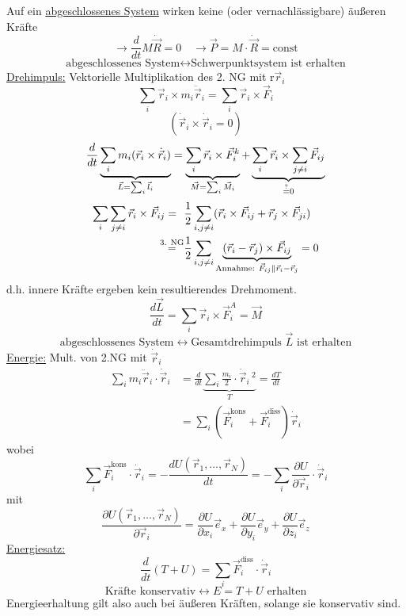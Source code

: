 \documentclass[titlepage,12pt,a4paper,ngerman]{report}
\newcommand{\tx}[1]{\textrm{#1}}
\begin{document}
{Auf ein \underline{abgeschlossenes System} wirken keine (oder vernachlässigbare) äußeren Kräfte\\
$$\rightarrow \frac{d}{dt} M \dot{\vec{R}} = 0 \quad \rightarrow \vec{P} = M \cdot \dot{\vec{R}} = \textrm{const}$$
$$\textrm{abgeschlossenes System} \leftrightarrow \textrm{Schwerpunktsystem ist erhalten}$$
\underline{Drehimpuls:} 
Vektorielle Multiplikation des 2. NG mit r$\vec{r}_i$ 
$$ \sum_{i} \vec{r}_i \times m_i\ddot{\vec{r}}_i = \sum_{i} \vec{r}_i \times \vec{F}_i$$
$$( \dot{\vec{r}}_i \times \dot{\vec{r}}_i = 0)$$
$$\frac{d}{dt} \underbrace{\sum_i m_i (\vec{r}_i \times \dot{\vec{r}}_i)} _{\vec{L} = \sum_i \vec{l}_i} = \underbrace{\sum_i \vec{r}_i \times \vec{F}_i^k}_{\vec{M} = \sum_i \vec{M}_i} + \underbrace{\sum_i \vec{r}_i \times \sum _{j\neq i} \vec{F}_{ij}}_{\buildrel ? \over = 0}$$
\begin{align*}
\sum_i \sum_{j\neq i} \vec{r}_i \times \vec{F}_{ij} = \ \  &\frac{1}{2} \sum_{i, j\neq i} (\vec{r}_i \times \vec{F}_{ij} + \vec{r}_j\times \vec{F}_{ji}) \\
\buildrel \textrm{3. NG} \over = &\frac{1}{2} \sum_{i,j\neq i} \underbrace{(\vec{r}_i - \vec{r}_j) \times \vec{F}_{ij}}_{\textrm{Annahme: } \vec{F}_{ij} \parallel \vec{r}_i - \vec{r}_j} = 0
\end{align*}
d.h. innere Kräfte ergeben kein resultierendes Drehmoment.
$$\frac{d\vec{L}}{dt} = \sum_i \vec{r}_i \times \vec{F}_i^A = \vec{M}  $$
$$\textrm{abgeschlossenes System} \leftrightarrow \textrm{Gesamtdrehimpuls } \vec{L} \textrm{ ist erhalten}$$
\underline{Energie:}
Mult. von 2.NG mit $\dot{\vec{r}}_i$ 
\begin{align*}
\sum_i m_i \ddot{\vec{r}}_i \cdot \dot{\vec{r}}_i &= \frac{d}{dt} \underbrace{\sum_i \frac{m_i}{2} \cdot \dot{\vec{r}}_i\,^2}_{T} = \frac{dT}{dt} \\
&= \sum_i (\vec{F}_{i}^{\tx{kons}} + \vec{F}_{i}^{\tx{diss}}) \dot{\vec{r}}_i
\end{align*}
wobei
$$ \sum_i \vec{F}_i^{\tx{kons}} \cdot \dot{\vec{r}}_i = -\frac{dU(\vec{r}_1,\dots , \vec{r}_N)}{dt} = - \sum_i \frac{\partial U}{\partial \vec{r}_i} \cdot \dot{\vec{r}}_i$$
mit
$$\frac{\partial U (\vec{r}_1, \dots , \vec{r}_N)}{\partial \vec{r}_i} = \frac{\partial U}{\partial x_i} \vec{e}_x + \frac{\partial U}{\partial y_i } \vec{e}_y + \frac{\partial U}{\partial z_i } \vec{e}_z$$
\underline{Energiesatz:}
$$ \frac{d}{dt} (T+U) = \sum_i \vec{F}^{\tx{diss}}_i \cdot \dot{\vec{r}}_i$$
$$\textrm{Kräfte konservativ} \leftrightarrow E =  T + U \textrm{ erhalten}$$
Energieerhaltung gilt also auch bei äußeren Kräften, solange sie konservativ sind.\par
}
\end{document}
